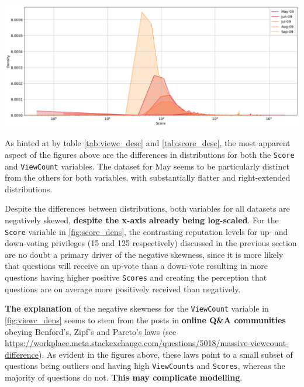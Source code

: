 \documentclass[11pt,preprint, authoryear]{article}
\let\origfigure\figure
\let\endorigfigure\endfigure
\renewenvironment{figure}[1][2] {
    \expandafter\origfigure\expandafter[H]
} {
    \endorigfigure
}
\numberwithin{equation}{section}
\begin{document}
\begin{figure}
\caption{\textbf{Score Density Plot}}
\label{fig:score_dens}

\begin{center}\includegraphics[width=1\linewidth]{../../01-python-code/00-workspace/01-eda/01-graphs/score-sgl-density-plot} \end{center}
\end{figure}

\normalsize

As hinted at by table \ref{tab:viewc_desc} and \ref{tab:score_desc}, the
most apparent aspect of the figures above are the differences in
distributions for both the \texttt{Score} and \texttt{ViewCount}
variables. The dataset for May seems to be particularly distinct from
the others for both variables, with substantially flatter and
right-extended distributions.

Despite the differences between distributions, both variables for all
datasets are negatively skewed, \textbf{despite the x-axis already being
log-scaled}. For the \texttt{Score} variable in \ref{fig:score_dens},
the contrasting reputation levels for up- and down-voting privileges (15
and 125 respectively) discussed in the previous section are no doubt a
primary driver of the negative skewness, since it is more likely that
questions will receive an up-vote than a down-vote resulting in more
questions having higher positive \texttt{Scores} and creating the
perception that questions are on average more positively received than
negatively.

\textbf{The explanation} of the negative skewness for the
\texttt{ViewCount} variable in \ref{fig:viewc_dens} seems to stem from
the posts in \textbf{online Q\&A communities} obeying Benford's, Zipf's
and Pareto's laws (see
\url{https://workplace.meta.stackexchange.com/questions/5018/massive-viewcount-difference}).
As evident in the figures above, these laws point to a small subset of
questions being outliers and having high \texttt{ViewCounts} and
\texttt{Scores}, whereas the majority of questions do not. \textbf{This
may complicate modelling}.
\end{document}
